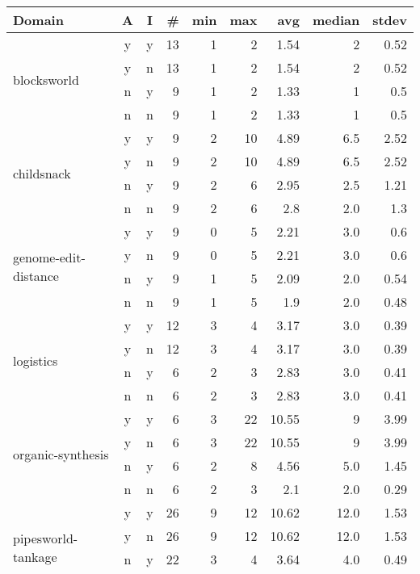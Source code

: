 \begin{table*}
	\centering
	\begin{tabular}{l|cc|rrrrrr}
		\toprule
		\textbf{Domain} & A & I & \# & min & max & avg & median & stdev \\
		\midrule
		\multirow{4}{*}{blocksworld}	&	y	&	y	&	13	&	1	&	2	&	1.54	&	2	&	0.52\\
			&	y	&	n	&	13	&	1	&	2	&	1.54	&	2	&	0.52\\
			&	n	&	y	&	9	&	1	&	2	&	1.33	&	1	&	0.5\\
			&	n	&	n	&	9	&	1	&	2	&	1.33	&	1	&	0.5\\
		\midrule
		\multirow{4}{*}{childsnack}	&	y	&	y	&	9	&	2	&	10	&	4.89	&	6.5	&	2.52\\
			&	y	&	n	&	9	&	2	&	10	&	4.89	&	6.5	&	2.52\\
			&	n	&	y	&	9	&	2	&	6	&	2.95	&	2.5	&	1.21\\
			&	n	&	n	&	9	&	2	&	6	&	2.8	&	2.0	&	1.3\\
		\midrule
		\multirow{4}{*}{genome-edit-distance}	&	y	&	y	&	9	&	0	&	5	&	2.21	&	3.0	&	0.6\\
			&	y	&	n	&	9	&	0	&	5	&	2.21	&	3.0	&	0.6\\
			&	n	&	y	&	9	&	1	&	5	&	2.09	&	2.0	&	0.54\\
			&	n	&	n	&	9	&	1	&	5	&	1.9	&	2.0	&	0.48\\
		\midrule
		\multirow{4}{*}{logistics}	&	y	&	y	&	12	&	3	&	4	&	3.17	&	3.0	&	0.39\\
			&	y	&	n	&	12	&	3	&	4	&	3.17	&	3.0	&	0.39\\
			&	n	&	y	&	6	&	2	&	3	&	2.83	&	3.0	&	0.41\\
			&	n	&	n	&	6	&	2	&	3	&	2.83	&	3.0	&	0.41\\
		\midrule
		\multirow{4}{*}{organic-synthesis}	&	y	&	y	&	6	&	3	&	22	&	10.55	&	9	&	3.99\\
			&	y	&	n	&	6	&	3	&	22	&	10.55	&	9	&	3.99\\
			&	n	&	y	&	6	&	2	&	8	&	4.56	&	5.0	&	1.45\\
			&	n	&	n	&	6	&	2	&	3	&	2.1	&	2.0	&	0.29\\
		\midrule
		\multirow{4}{*}{pipesworld-tankage}	&	y	&	y	&	26	&	9	&	12	&	10.62	&	12.0	&	1.53\\
			&	y	&	n	&	26	&	9	&	12	&	10.62	&	12.0	&	1.53\\
			&	n	&	y	&	22	&	3	&	4	&	3.64	&	4.0	&	0.49\\
			&	n	&	n	&	22	&	3	&	5	&	3.73	&	4.0	&	0.63\\
		\midrule
		\multirow{4}{*}{rovers}	&	y	&	y	&	26	&	2	&	6	&	4.23	&	5.0	&	1.27\\

\end{tabular}
\end{table*}
